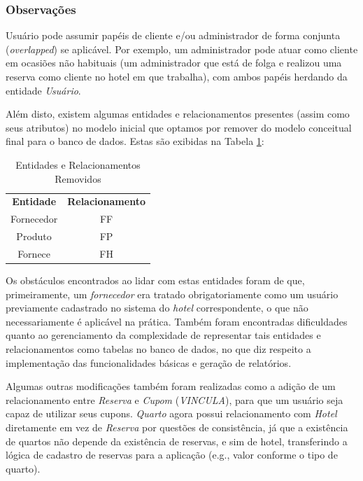 \documentclass[a4paper, 12pt]{article}
\begin{document}
\subsubsection{Observações}

Usuário pode assumir papéis de cliente e/ou administrador de forma conjunta (\emph{overlapped}) se aplicável. Por exemplo, um administrador pode atuar como cliente em ocasiões não habituais (um administrador que está de folga e realizou uma reserva como cliente no hotel em que trabalha), com ambos papéis herdando da entidade \emph{Usuário}.

Além disto, existem algumas entidades e relacionamentos presentes (assim como seus atributos) no modelo inicial que optamos por remover do modelo conceitual final para o banco de dados. Estas são exibidas na Tabela \ref{tab:exampleTab1}:
\begin{table}[H]
    \centering
    \caption{Entidades e Relacionamentos Removidos}\vspace{0.5cm}
    \label{tab:exampleTab1}
    \begin{tabular}{c|c}
        \textbf{Entidade} & \textbf{Relacionamento}\\
        Fornecedor & FF\\
        Produto & FP\\
        Fornece & FH
    \end{tabular}
\end{table}

Os obstáculos encontrados ao lidar com estas entidades foram de que, primeiramente, um \emph{fornecedor} era tratado obrigatoriamente como um usuário previamente cadastrado no sistema do \emph{hotel} correspondente, o que não necessariamente é aplicável na prática. Também foram encontradas dificuldades quanto ao gerenciamento da complexidade de representar tais entidades e relacionamentos como tabelas no banco de dados, no que diz respeito a implementação das funcionalidades básicas e geração de relatórios.

Algumas outras modificações também foram realizadas como a adição de um relacionamento entre \emph{Reserva} e \emph{Cupom} (\emph{VINCULA}), para que um usuário seja capaz de utilizar seus cupons. \emph{Quarto} agora possui relacionamento com \emph{Hotel} diretamente em vez de \emph{Reserva} por questões de consistência, já que a existência de quartos não depende da existência de reservas, e sim de hotel, transferindo a lógica de cadastro de reservas para a aplicação (e.g., valor conforme o tipo de quarto).
\end{document}
